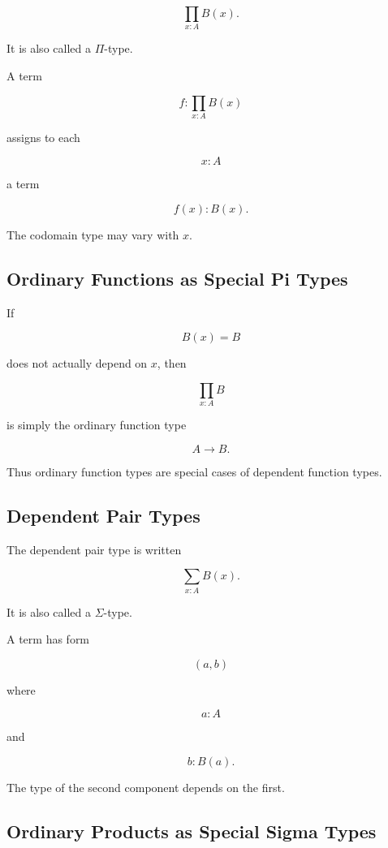 \[
\boxed{
\prod_{x:A}B(x).
}
\]

It is also called a \(\Pi\)-type.

A term

\[
f:
\prod_{x:A}B(x)
\]

assigns to each

\[
x:A
\]

a term

\[
\boxed{
f(x):B(x).
}
\]

The codomain type may vary with \(x\).

\subsection{Ordinary Functions as Special Pi Types}
\label{subsec:ordinary-function-pi-type}

If

\[
B(x)=B
\]

does not actually depend on \(x\), then

\[
\boxed{
\prod_{x:A}B
}
\]

is simply the ordinary function type

\[
\boxed{
A\to B.
}
\]

Thus ordinary function types are special cases of dependent function types.

\subsection{Dependent Pair Types}
\label{subsec:dependent-pair-types}

The dependent pair type is written

\[
\boxed{
\sum_{x:A}B(x).
}
\]

It is also called a \(\Sigma\)-type.

A term has form

\[
\boxed{
(a,b)
}
\]

where

\[
a:A
\]

and

\[
b:B(a).
\]

The type of the second component depends on the first.

\subsection{Ordinary Products as Special Sigma Types}
\label{subsec:ordinary-product-sigma-type}

